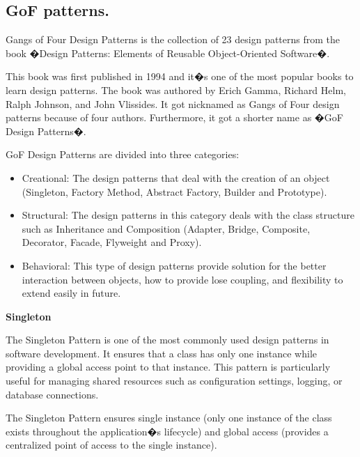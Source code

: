 \medskip
\begin{center}
\section*{GoF patterns.}
\end{center}

Gangs of Four Design Patterns is the collection of 23 design patterns from the book �Design Patterns: Elements of Reusable Object-Oriented Software�.

This book was first published in 1994 and it�s one of the most popular books to learn design patterns. The book was authored by Erich Gamma, Richard Helm, Ralph Johnson, and John Vlissides. It got nicknamed as Gangs of Four design patterns because of four authors. Furthermore, it got a shorter name as �GoF Design Patterns�.

GoF Design Patterns are divided into three categories:

\begin{itemize}
\item Creational: The design patterns that deal with the creation of an object (Singleton, Factory Method, Abstract Factory, Builder and Prototype).

\item Structural: The design patterns in this category deals with the class structure such as Inheritance and Composition (Adapter, Bridge, Composite, Decorator, Facade, Flyweight and Proxy).

\item Behavioral: This type of design patterns provide solution for the better interaction between objects, how to provide lose coupling, and flexibility to extend easily in future.
\end{itemize}



\medskip
\begin{center}
\textbf{Singleton}
\end{center}

The Singleton Pattern is one of the most commonly used design patterns in software development. It ensures that a class has only one instance while providing a global access point to that instance. This pattern is particularly useful for managing shared resources such as configuration settings, logging, or database connections.

The Singleton Pattern ensures single instance (only one instance of the class exists throughout the application�s lifecycle) and global access (provides a centralized point of access to the single instance).

